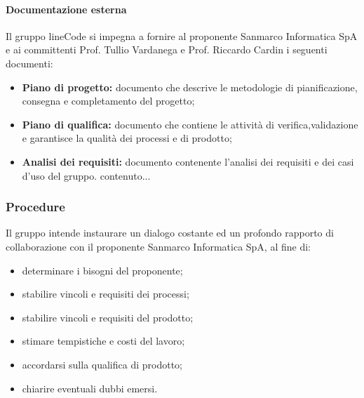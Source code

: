 \documentclass[]{article}
\begin{document}
							
						\paragraph{Documentazione esterna}
						 Il gruppo lineCode si impegna a fornire al proponente Sanmarco Informatica SpA e ai committenti Prof. Tullio Vardanega e Prof. Riccardo Cardin i seguenti documenti:
						 \begin{itemize}
						 	\item \textbf{Piano di progetto:} documento che descrive le metodologie di pianificazione, consegna e completamento del progetto;
						 	\item \textbf{Piano di qualifica:} documento che contiene le attività di verifica,validazione e garantisce la qualità dei processi e di prodotto;
						 	\item \textbf{Analisi dei requisiti:} documento contenente l'analisi dei requisiti e dei casi d'uso del gruppo.
						 	contenuto...
						 \end{itemize}
					
					\subsubsection{Procedure}
						Il gruppo intende instaurare un dialogo costante ed un profondo rapporto di collaborazione con il proponente Sanmarco Informatica SpA, al fine di:
						\begin{itemize}
							\item determinare i bisogni del proponente;
							\item stabilire vincoli e  requisiti dei processi;
							\item stabilire vincoli e requisiti del prodotto;
							\item stimare tempistiche e costi del lavoro;
							\item accordarsi sulla qualifica di prodotto;
							\item chiarire eventuali dubbi emersi.
							
						\end{itemize}
						
			
		
\end{document}
